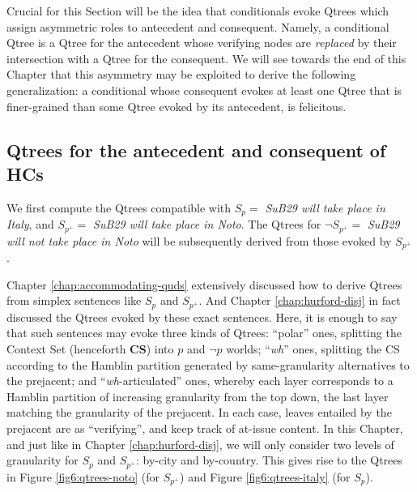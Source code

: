 \begin{exe}
	\begin{xlist}
	\end{xlist}
\end{exe}

Crucial for this Section will be the idea that conditionals evoke Qtrees which assign asymmetric roles to antecedent and consequent. Namely, a conditional Qtree is a Qtree for the antecedent whose verifying nodes are \textit{replaced} by their intersection with a Qtree for the consequent. We will see towards the end of this Chapter that this asymmetry may be exploited to derive the following generalization: a conditional whose consequent evokes at least one Qtree that is finer-grained than some Qtree evoked by its antecedent, is felicitous.

\subsection{Qtrees for the antecedent and consequent of HCs}

We first compute the Qtrees compatible with $S_p = $ \textit{SuB29 will take place in Italy}, and $S_{p^+} = $ \textit{SuB29 will take place in Noto}. The Qtrees for $\neg S_{p^+} = $ \textit{SuB29 will not take place in Noto} will be subsequently derived from those evoked by $S_{p^+}$.

Chapter \ref{chap:accommodating-quds} extensively discussed how to derive Qtrees from simplex sentences like $S_p$ and $S_{p^+}$. And Chapter \ref{chap:hurford-disj} in fact discussed the Qtrees evoked by these exact sentences. Here, it is enough to say that such sentences may evoke three kinds of Qtrees: ``polar'' ones, splitting the Context Set (henceforth \textbf{CS}) into $p$ and $\neg p$ worlds; ``\textit{wh}'' ones, splitting the CS according to the Hamblin partition generated by same-granularity alternatives to the prejacent; and ``\textit{wh}-articulated'' ones, whereby each layer corresponds to a Hamblin partition of increasing granularity from the top down, the last layer matching the granularity of the prejacent. In each case, leaves entailed by the prejacent are \setlength{\fboxsep}{1pt} as ``verifying'', and keep track of at-issue content. In this Chapter, and just like in Chapter \ref{chap:hurford-disj}, we will only consider two levels of granularity for $S_p$ and $S_{p^+}$: by-city and by-country. This gives rise to the Qtrees in Figure \ref{fig6:qtrees-noto} (for $S_{p^+}$) and Figure \ref{fig6:qtrees-italy} (for $S_{p}$). 

